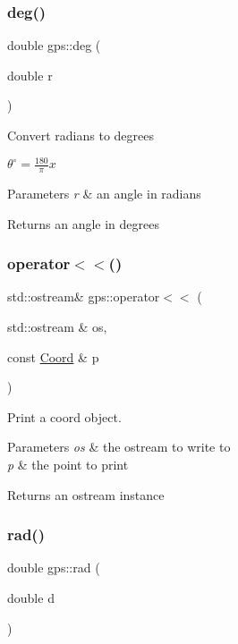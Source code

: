 \subsubsection{\texorpdfstring{deg()}{deg()}}
{\footnotesize\ttfamily double gps\+::deg (\begin{DoxyParamCaption}\item[{double}]{r }\end{DoxyParamCaption})}

Convert radians to degrees

$ \theta^\circ = \frac{180}{\pi} x $


\begin{DoxyParams}{Parameters}
{\em r} & an angle in radians \\
\hline
\end{DoxyParams}
\begin{DoxyReturn}{Returns}
an angle in degrees 
\end{DoxyReturn}
\mbox{\label{namespacegps_a5fb543469635387159ce1b8e24f6f78a}} 
\subsubsection{\texorpdfstring{operator$<$$<$()}{operator<<()}}
{\footnotesize\ttfamily std\+::ostream\& gps\+::operator$<$$<$ (\begin{DoxyParamCaption}\item[{std\+::ostream \&}]{os,  }\item[{const \hyperlink{classgps_1_1Coord}{Coord} \&}]{p }\end{DoxyParamCaption})\hspace{0.3cm}{\ttfamily [inline]}}

Print a coord object. 
\begin{DoxyParams}{Parameters}
{\em os} & the ostream to write to \\
\hline
{\em p} & the point to print \\
\hline
\end{DoxyParams}
\begin{DoxyReturn}{Returns}
an ostream instance 
\end{DoxyReturn}
\mbox{\label{namespacegps_ad44ea39876137fc96774486e3a60f004}} 
\subsubsection{\texorpdfstring{rad()}{rad()}}
{\footnotesize\ttfamily double gps\+::rad (\begin{DoxyParamCaption}\item[{double}]{d }\end{DoxyParamCaption})}

